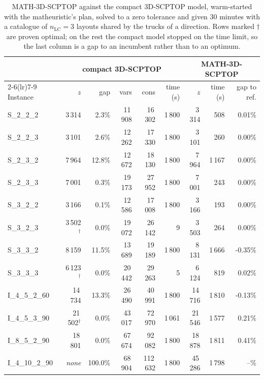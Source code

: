 \begin{table}[!htbp]
\centering
\small
\caption{MATH-3D-SCPTOP against the compact 3D-SCPTOP model, warm-started with the matheuristic's plan, solved to a zero tolerance and given 30 minutes with a catalogue of $n_{\mathrm{LC}}=3$ layouts shared by the trucks of a direction. Rows marked $\dagger$ are proven optimal; on the rest the compact model stopped on the time limit, so the last column is a gap to an incumbent rather than to an optimum.}
\label{tab:exact}
\begin{tabular}{lrrrrrrrr}
\toprule
& \multicolumn{5}{c}{compact 3D-SCPTOP} & \multicolumn{3}{c}{MATH-3D-SCPTOP} \\
\cmidrule(lr){2-6}\cmidrule(lr){7-9}
Instance & $z$ & gap & vars & cons & time (s) & $z$ & time (s) & gap to ref. \\
\midrule
S\_2\_2\_2 & 3\,314 & 2.3\% & 11\,908 & 16\,302 & 1\,800 & 3\,314 & 508 & 0.01\% \\
S\_2\_2\_3 & 3\,101 & 2.6\% & 12\,262 & 17\,330 & 1\,800 & 3\,101 & 260 & 0.00\% \\
S\_2\_3\_2 & 7\,964 & 12.8\% & 12\,672 & 18\,130 & 1\,800 & 7\,964 & 1\,167 & 0.00\% \\
S\_2\_3\_3 & 7\,001 & 0.3\% & 19\,173 & 27\,952 & 1\,800 & 7\,001 & 243 & 0.00\% \\
S\_3\_2\_2 & 3\,166 & 0.1\% & 12\,586 & 17\,008 & 1\,800 & 3\,166 & 193 & 0.00\% \\
S\_3\_2\_3 & 3\,502$^\dagger$ & 0.0\% & 19\,072 & 26\,142 & 9 & 3\,503 & 264 & 0.00\% \\
S\_3\_3\_2 & 8\,159 & 11.5\% & 13\,689 & 19\,189 & 1\,800 & 8\,131 & 1\,666 & -0.35\% \\
S\_3\_3\_3 & 6\,123$^\dagger$ & 0.0\% & 20\,442 & 29\,263 & 5 & 6\,124 & 819 & 0.02\% \\
I\_4\_5\_2\_60 & 14\,734 & 13.3\% & 26\,490 & 40\,991 & 1\,800 & 14\,716 & 1\,810 & -0.13\% \\
I\_4\_5\_3\_90 & 21\,502$^\dagger$ & 0.0\% & 43\,017 & 72\,970 & 1\,061 & 21\,546 & 1\,577 & 0.21\% \\
I\_8\_5\_2\_90 & 18\,801 & 0.0\% & 67\,674 & 92\,082 & 1\,800 & 18\,878 & 1\,811 & 0.41\% \\
I\_4\_10\_2\_90 & \emph{none} & 100.0\% & 68\,904 & 112\,632 & 1\,800 & 45\,286 & 1\,798 & --\% \\
\bottomrule
\end{tabular}
\end{table}

